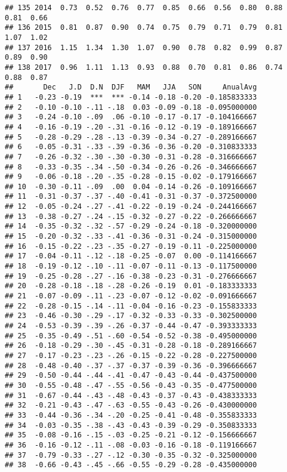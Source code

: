 \documentclass[]{article}
\begin{document}
\begin{verbatim}
## 135 2014  0.73  0.52  0.76  0.77  0.85  0.66  0.56  0.80  0.88  0.81  0.66
## 136 2015  0.81  0.87  0.90  0.74  0.75  0.79  0.71  0.79  0.81  1.07  1.02
## 137 2016  1.15  1.34  1.30  1.07  0.90  0.78  0.82  0.99  0.87  0.89  0.90
## 138 2017  0.96  1.11  1.13  0.93  0.88  0.70  0.81  0.86  0.74  0.88  0.87
##       Dec   J.D  D.N  DJF   MAM   JJA   SON     AnualAvg
## 1   -0.23 -0.19  ***  *** -0.14 -0.18 -0.20 -0.185833333
## 2   -0.10 -0.10 -.11 -.18  0.03 -0.09 -0.18 -0.095000000
## 3   -0.24 -0.10 -.09  .06 -0.10 -0.17 -0.17 -0.104166667
## 4   -0.16 -0.19 -.20 -.31 -0.16 -0.12 -0.19 -0.189166667
## 5   -0.28 -0.29 -.28 -.13 -0.39 -0.34 -0.27 -0.289166667
## 6   -0.05 -0.31 -.33 -.39 -0.36 -0.36 -0.20 -0.310833333
## 7   -0.26 -0.32 -.30 -.30 -0.30 -0.31 -0.28 -0.316666667
## 8   -0.33 -0.35 -.34 -.50 -0.34 -0.26 -0.26 -0.346666667
## 9   -0.06 -0.18 -.20 -.35 -0.28 -0.15 -0.02 -0.179166667
## 10  -0.30 -0.11 -.09  .00  0.04 -0.14 -0.26 -0.109166667
## 11  -0.31 -0.37 -.37 -.40 -0.41 -0.31 -0.37 -0.372500000
## 12  -0.05 -0.24 -.27 -.41 -0.22 -0.19 -0.24 -0.244166667
## 13  -0.38 -0.27 -.24 -.15 -0.32 -0.27 -0.22 -0.266666667
## 14  -0.35 -0.32 -.32 -.57 -0.29 -0.24 -0.18 -0.320000000
## 15  -0.20 -0.32 -.33 -.41 -0.36 -0.31 -0.24 -0.315000000
## 16  -0.15 -0.22 -.23 -.35 -0.27 -0.19 -0.11 -0.225000000
## 17  -0.04 -0.11 -.12 -.18 -0.25 -0.07  0.00 -0.114166667
## 18  -0.19 -0.12 -.10 -.11 -0.07 -0.11 -0.13 -0.117500000
## 19  -0.25 -0.28 -.27 -.16 -0.38 -0.23 -0.31 -0.276666667
## 20  -0.28 -0.18 -.18 -.28 -0.26 -0.19  0.01 -0.183333333
## 21  -0.07 -0.09 -.11 -.23 -0.07 -0.12 -0.02 -0.091666667
## 22  -0.28 -0.15 -.14 -.11 -0.04 -0.16 -0.23 -0.155833333
## 23  -0.46 -0.30 -.29 -.17 -0.32 -0.33 -0.33 -0.302500000
## 24  -0.53 -0.39 -.39 -.26 -0.37 -0.44 -0.47 -0.393333333
## 25  -0.35 -0.49 -.51 -.60 -0.54 -0.52 -0.38 -0.495000000
## 26  -0.18 -0.29 -.30 -.45 -0.31 -0.28 -0.18 -0.289166667
## 27  -0.17 -0.23 -.23 -.26 -0.15 -0.22 -0.28 -0.227500000
## 28  -0.48 -0.40 -.37 -.37 -0.37 -0.39 -0.36 -0.396666667
## 29  -0.50 -0.44 -.44 -.41 -0.47 -0.43 -0.44 -0.437500000
## 30  -0.55 -0.48 -.47 -.55 -0.56 -0.43 -0.35 -0.477500000
## 31  -0.67 -0.44 -.43 -.48 -0.43 -0.37 -0.43 -0.438333333
## 32  -0.21 -0.43 -.47 -.63 -0.55 -0.43 -0.26 -0.430000000
## 33  -0.44 -0.36 -.34 -.20 -0.25 -0.41 -0.48 -0.355833333
## 34  -0.03 -0.35 -.38 -.43 -0.43 -0.39 -0.29 -0.350833333
## 35  -0.08 -0.16 -.15 -.03 -0.25 -0.21 -0.12 -0.156666667
## 36  -0.16 -0.12 -.11 -.08 -0.03 -0.16 -0.18 -0.119166667
## 37  -0.79 -0.33 -.27 -.12 -0.30 -0.35 -0.32 -0.325000000
## 38  -0.66 -0.43 -.45 -.66 -0.55 -0.29 -0.28 -0.435000000

\end{verbatim}
\end{document}
